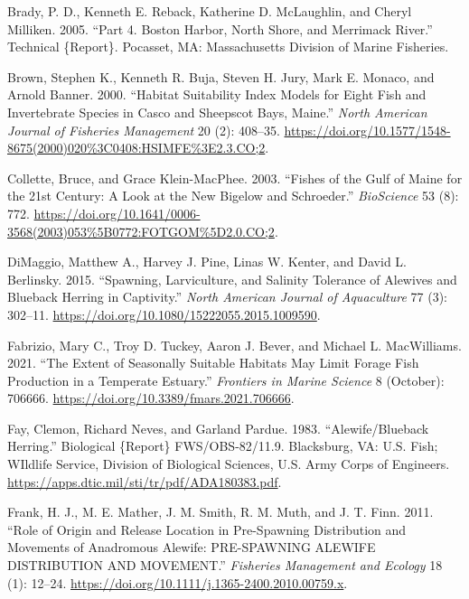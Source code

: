 \documentclass[
]{book}
\newlength{\cslhangindent}
\newlength{\cslentryspacingunit} %
\newenvironment{CSLReferences}[2] %
 {%
  \setlength{\parindent}{0pt}
  \ifodd #1
  \let\oldpar\par
  \def\par{\hangindent=\cslhangindent\oldpar}
  \fi
  \setlength{\parskip}{#2\cslentryspacingunit}
 }%
 {}
\begin{document}
\begin{CSLReferences}{1}{0}
\leavevmode{}%
Brady, P. D., Kenneth E. Reback, Katherine D. McLaughlin, and Cheryl Milliken. 2005. {``Part 4. {Boston} {Harbor}, {North} {Shore}, and {Merrimack} {River}.''} Technical \{Report\}. Pocasset, MA: Massachusetts Division of Marine Fisheries.

\leavevmode{}%
Brown, Stephen K., Kenneth R. Buja, Steven H. Jury, Mark E. Monaco, and Arnold Banner. 2000. {``Habitat {Suitability} {Index} {Models} for {Eight} {Fish} and {Invertebrate} {Species} in {Casco} and {Sheepscot} {Bays}, {Maine}.''} \emph{North American Journal of Fisheries Management} 20 (2): 408--35. \url{https://doi.org/10.1577/1548-8675(2000)020\%3C0408:HSIMFE\%3E2.3.CO;2}.

\leavevmode{}%
Collette, Bruce, and Grace Klein-MacPhee. 2003. {``Fishes of the {Gulf} of {Maine} for the 21st {Century}: {A} {Look} at the {New} {Bigelow} and {Schroeder}.''} \emph{BioScience} 53 (8): 772. \url{https://doi.org/10.1641/0006-3568(2003)053\%5B0772:FOTGOM\%5D2.0.CO;2}.

\leavevmode{}%
DiMaggio, Matthew A., Harvey J. Pine, Linas W. Kenter, and David L. Berlinsky. 2015. {``Spawning, {Larviculture}, and {Salinity} {Tolerance} of {Alewives} and {Blueback} {Herring} in {Captivity}.''} \emph{North American Journal of Aquaculture} 77 (3): 302--11. \url{https://doi.org/10.1080/15222055.2015.1009590}.

\leavevmode{}%
Fabrizio, Mary C., Troy D. Tuckey, Aaron J. Bever, and Michael L. MacWilliams. 2021. {``The {Extent} of {Seasonally} {Suitable} {Habitats} {May} {Limit} {Forage} {Fish} {Production} in a {Temperate} {Estuary}.''} \emph{Frontiers in Marine Science} 8 (October): 706666. \url{https://doi.org/10.3389/fmars.2021.706666}.

\leavevmode{}%
Fay, Clemon, Richard Neves, and Garland Pardue. 1983. {``Alewife/{Blueback} {Herring}.''} Biological \{Report\} FWS/OBS-82/11.9. Blacksburg, VA: U.S. Fish; WIldlife Service, Division of Biological Sciences, U.S. Army Corps of Engineers. \url{https://apps.dtic.mil/sti/tr/pdf/ADA180383.pdf}.

\leavevmode{}%
Frank, H. J., M. E. Mather, J. M. Smith, R. M. Muth, and J. T. Finn. 2011. {``Role of Origin and Release Location in Pre-Spawning Distribution and Movements of Anadromous Alewife: {PRE}-{SPAWNING} {ALEWIFE} {DISTRIBUTION} {AND} {MOVEMENT}.''} \emph{Fisheries Management and Ecology} 18 (1): 12--24. \url{https://doi.org/10.1111/j.1365-2400.2010.00759.x}.


\end{CSLReferences}
\end{document}
